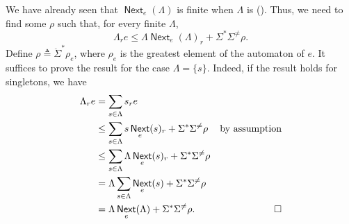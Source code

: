 \documentclass[a4paper,UKenglish,cleveref, autoref, thm-restate]{lipics-v2021}
\DeclareMathOperator{\Next}{\mathsf{Next}}
\begin{document}
\begin{proofEnd}
  We have already seen that $\Next_e( \Lambda )$ is finite when $ \Lambda $ is
  ().  Thus, we need to find some $ \rho $ such that, for every
  finite $ \Lambda $,
  \[  \Lambda _re  \leq   \Lambda \Next_e( \Lambda )_r +  \Sigma ^* \Sigma ^{ \neq } \rho . \] Define $ \rho   \triangleq  \ddot{ \Sigma }^* \rho _e$, where
  $ \rho _e$ is the greatest element of the automaton of $e$. It suffices to prove
  the result for the case $ \Lambda  = \{s\}$.  Indeed, if the result holds for
  singletons, we have
  \begin{align*}
     \Lambda _re
    & =  \sum _{s  \in   \Lambda } s_re \\
    &  \leq   \sum _{s  \in   \Lambda } s\Next_e(s)_r +  \Sigma ^* \Sigma ^{ \neq } \rho 
    & \text{by assumption} \\
    &  \leq   \sum _{s  \in   \Lambda }  \Lambda \Next_e(s)_r +  \Sigma ^* \Sigma ^{ \neq } \rho  \\
    & =  \Lambda  \sum _{s  \in   \Lambda }\Next_e(s) +  \Sigma ^* \Sigma ^{ \neq } \rho  \\
    & =  \Lambda \Next_e( \Lambda ) +  \Sigma ^* \Sigma ^{ \neq } \rho .  & \qedhere
  \end{align*}


\end{proofEnd}
\end{document}
